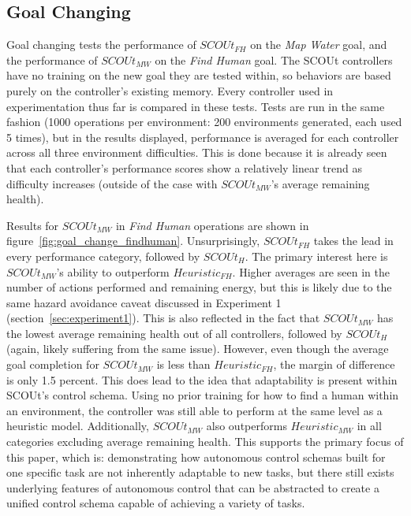 \subsection{Goal Changing}
Goal changing tests the performance of $SCOUt_{FH}$ on the \textit{Map Water} goal, and the performance of $SCOUt_{MW}$ on the \textit{Find Human} goal.
The SCOUt controllers have no training on the new goal they are tested within, so behaviors are based purely on the controller's existing memory.
Every controller used in experimentation thus far is compared in these tests.
Tests are run in the same fashion (1000 operations per environment: 200 environments generated, each used 5 times), but in the results displayed, performance is averaged for each controller across all three environment difficulties.
This is done because it is already seen that each controller's performance scores show a relatively linear trend as difficulty increases (outside of the case with $SCOUt_{MW}$'s average remaining health).

Results for $SCOUt_{MW}$ in \textit{Find Human} operations are shown in figure~\ref{fig:goal_change_findhuman}.
Unsurprisingly, $SCOUt_{FH}$ takes the lead in every performance category, followed by $SCOUt_{H}$.
The primary interest here is $SCOUt_{MW}$'s ability to outperform $Heuristic_{FH}$.
Higher averages are seen in the number of actions performed and remaining energy, but this is likely due to the same hazard avoidance caveat discussed in Experiment 1 (section~\ref{sec:experiment1}).
This is also reflected in the fact that $SCOUt_{MW}$ has the lowest average remaining health out of all controllers, followed by $SCOUt_{H}$ (again, likely suffering from the same issue).
However, even though the average goal completion for $SCOUt_{MW}$ is less than $Heuristic_{FH}$, the margin of difference is only 1.5 percent.
This does lead to the idea that adaptability is present within SCOUt's control schema.
Using no prior training for how to find a human within an environment, the controller was still able to perform at the same level as a heuristic model.
Additionally, $SCOUt_{MW}$ also outperforms $Heuristic_{MW}$ in all categories excluding average remaining health.
This supports the primary focus of this paper, which is: demonstrating how autonomous control schemas built for one specific task are not inherently adaptable to new tasks, but there still exists underlying features of autonomous control that can be abstracted to create a unified control schema capable of achieving a variety of tasks.

